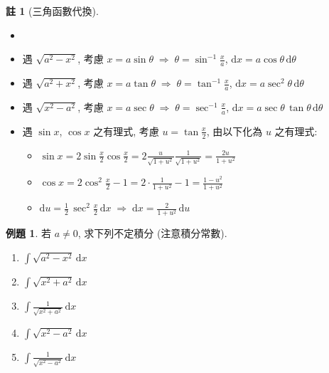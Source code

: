 \documentclass[12pt]{extarticle}
\newcommand{\ds}{\displaystyle}
\newcommand{\ie}{\;\Longrightarrow\;}
\theoremstyle{definition}
\newtheorem*{eg}{例題}
\newtheorem*{rmk}{註}
\begin{document}
\begin{rmk}[三角函數代換]
\begin{itemize}\setlength{\itemsep}{0pt}
  \item[]
  \item 遇 $\ds\sqrt{a^2 - x^2}$, 考慮 $\ds x = a\sin\theta \ie \theta = \sin^{-1}\frac{x}{a}$, $\ds\text{d}x = a\cos\theta\,\text{d}\theta$ 
  \item 遇 $\ds\sqrt{a^2 + x^2}$, 考慮 $\ds x = a\tan\theta \ie \theta = \tan^{-1}\frac{x}{a}$, $\ds\text{d}x = a\sec^2\theta\,\text{d}\theta$
  \item 遇 $\ds\sqrt{x^2 - a^2}$, 考慮 $\ds x = a\sec\theta \ie \theta = \sec^{-1}\frac{x}{a}$, $\ds\text{d}x = a\sec\theta\,\tan\theta\,\text{d}\theta$
  \item 遇 $\ds\sin x$, $\ds\cos x$ 之有理式, 考慮 $\ds u = \tan\frac{x}{2}$, 由以下化為 $u$ 之有理式: 
    \begin{itemize}\setlength{\itemsep}{0pt}
      \item $\ds\sin x = 2\sin\frac{x}{2}\cos\frac{x}{2} = 2\frac{u}{\sqrt{1 + u^2}}\frac{1}{\sqrt{1 + u^2}} = \frac{2 u}{1 + u^2}$
      \item $\ds\cos x = 2\cos^2\frac{x}{2} - 1 = 2\cdot\frac{1}{1 + u^2} - 1 = \frac{1 - u^2}{1 + u^2}$
      \item $\ds\text{d}u = \frac{1}{2}\,\sec^2\frac{x}{2}\,\text{d}x \ie \text{d}x = \frac{2}{1 + u^2}\,\text{d}u$
    \end{itemize}
\end{itemize}
\end{rmk}

\begin{eg} 若 $a\ne 0$, 求下列不定積分 (注意積分常數). 
  \begin{multicols}{5}
    \begin{enumerate}\setlength{\itemsep}{0pt}
      \item $\ds\int\!\sqrt{a^2 - x^2}\,\text{d}x$
      \item $\ds\int\!\sqrt{x^2 + a^2}\,\text{d}x$
      \item $\ds\int\!\frac{1}{\sqrt{x^2 + a^2}}\,\text{d}x$
      \item $\ds\int\!\sqrt{x^2 - a^2}\,\text{d}x$
      \item $\ds\int\!\frac{1}{\sqrt{x^2 - a^2}}\,\text{d}x$
    \end{enumerate}
  \end{multicols}
\end{eg}
\end{document}
